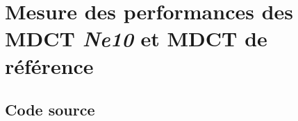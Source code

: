 \documentclass{article}
\begin{document}

\newpage
\section{Mesure des performances des MDCT \emph{Ne10} et MDCT de référence}\label{app:perf_mdct_ne10}
\subsection{Code source}\label{app:perf_mdct_ne10_code}
\end{document}

